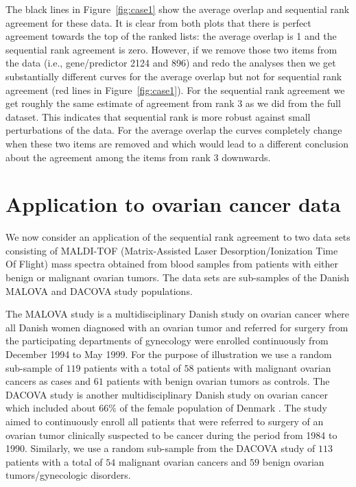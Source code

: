 \documentclass[12pt,a4paper]{article}
\theoremstyle{plain}
\begin{document}
 The black lines in Figure~\ref{fig:case1} show the average overlap
 and sequential rank agreement for these data. It is clear from both
 plots that there is perfect agreement towards the top of the ranked
 lists: the average overlap is 1 and the sequential rank agreement is
 zero.  However, if we remove those two items from the data (i.e.,
 gene/predictor 2124 and 896) and redo the analyses then we get
 substantially different curves for the average overlap but not for
 sequential rank agreement (red lines in Figure~\ref{fig:case1}). For
 the sequential rank agreement we get roughly the same estimate of
 agreement from rank 3 as we did from the full dataset. This indicates
 that sequential rank is more robust against small perturbations of
 the data. For the average overlap the curves completely change when
 these two items are removed and which would lead to a different
 conclusion about the agreement among the items from rank 3 downwards.



\section{Application to ovarian cancer data}
We now consider an application of the sequential rank agreement to two
data sets consisting of MALDI-TOF (Matrix-Assisted Laser
Desorption/Ionization Time Of Flight) mass spectra obtained from blood
samples from patients with either benign or malignant ovarian
tumors. The data sets are sub-samples of the Danish MALOVA and DACOVA
study populations.

The MALOVA study is a multidisciplinary Danish study on ovarian cancer
\citep{Hogdall:2004:Cancer:15160342} where all Danish women diagnosed
with an ovarian tumor and referred for surgery from the participating
departments of gynecology were enrolled continuously from December
1994 to May 1999. For the purpose of illustration we use a random
sub-sample of $119$ patients with a total of $58$ patients with
malignant ovarian cancers as cases and $61$ patients with benign
ovarian tumors as controls. The DACOVA study is another
multidisciplinary Danish study on ovarian cancer which included about
$66\%$ of the female population of Denmark
\citep{bertelsen1991protocol}. The study aimed to continuously enroll
all patients that were referred to surgery of an ovarian tumor
clinically suspected to be cancer during the period from 1984 to
1990. Similarly, we use a random sub-sample from the DACOVA study of
$113$ patients with a total of $54$ malignant ovarian cancers and $59$
benign ovarian tumors/gynecologic disorders.
\end{document}
